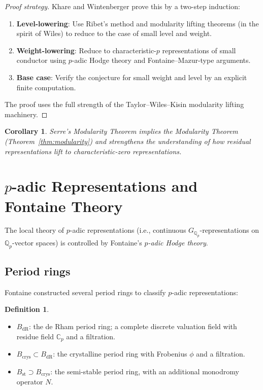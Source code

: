 \documentclass[a4paper,12pt]{amsart}
\newtheorem{corollary}[theorem]{Corollary}
\theoremstyle{definition}
\newtheorem{definition}[theorem]{Definition}
\theoremstyle{remark}
\newcommand{\Q}{\mathbb{Q}}
\newcommand{\BdR}{B_{\mathrm{dR}}}
\newcommand{\Bcrys}{B_{\mathrm{crys}}}
\begin{document}
\begin{proof}[Proof strategy]
Khare and Wintenberger prove this by a two-step induction:
\begin{enumerate}[label=(\alph*)]
\item \textbf{Level-lowering}: Use Ribet's method and modularity lifting theorems
  (in the spirit of Wiles) to reduce to the case of small level and weight.
\item \textbf{Weight-lowering}: Reduce to characteristic-$p$ representations of
  small conductor using $p$-adic Hodge theory and Fontaine--Mazur-type arguments.
\item \textbf{Base case}: Verify the conjecture for small weight and level by an
  explicit finite computation.
\end{enumerate}
The proof uses the full strength of the Taylor--Wiles--Kisin modularity lifting
machinery.
\end{proof}

\begin{corollary}
Serre's Modularity Theorem implies the Modularity Theorem (Theorem~\ref{thm:modularity})
and strengthens the understanding of how residual representations lift to
characteristic-zero representations.
\end{corollary}

\section{\texorpdfstring{$p$}{p}-adic Representations and Fontaine Theory}
\label{sec:fontaine}

The local theory of $p$-adic representations (i.e., continuous $G_{\Q_p}$-representations
on $\Q_p$-vector spaces) is controlled by Fontaine's \emph{$p$-adic Hodge theory}.

\subsection{Period rings}

Fontaine constructed several period rings to classify $p$-adic representations:

\begin{definition}
\begin{itemize}
  \item $\BdR$: the de Rham period ring; a complete discrete valuation field with
    residue field $\mathbb{C}_p$ and a filtration.
  \item $\Bcrys \subset \BdR$: the crystalline period ring with Frobenius $\phi$
    and a filtration.
  \item $B_{\mathrm{st}} \supset \Bcrys$: the semi-stable period ring, with an
    additional monodromy operator $N$.
\end{itemize}
\end{definition}
\end{document}
